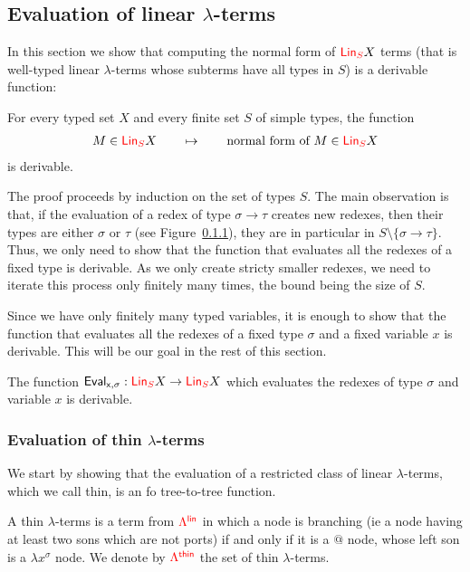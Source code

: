 \subsection{Evaluation of linear $\lambda$-terms}

In this section we show that computing the normal form of ${\color{red}{\mathsf{Lin}_{S}}} X$ terms (that is well-typed linear $\lambda$-terms whose subterms have all types in $S$) is a derivable function:

 \begin{proposition}\label{prop:one-register} 
    For every typed set $X$ and every finite set $S$ of simple types, the function 
    \begin{align*}
        M \in  {\color{red}{\mathsf{Lin}_{S}}} X \qquad \mapsto \qquad \text{normal form of $M$} \in  {\color{red}{\mathsf{Lin}_{S}}} X
    \end{align*}
    is derivable.
\end{proposition}

The proof proceeds by induction on the set of types $S$. The main observation is that, if the evaluation of a redex of type $\sigma\rightarrow \tau$ creates new redexes, then their types are either $\sigma$ or $\tau$ (see Figure~\ref{}), they are in particular in $S\setminus\{\sigma\rightarrow\tau\}$. Thus, we only need to show that the function that evaluates all the redexes of a fixed type is derivable. As we only create stricty smaller redexes, we need to iterate this process only finitely many times, the bound being the size of $S$. 

  Since we have only finitely many typed variables, it is enough to show that the function that evaluates all the redexes of a fixed type $\sigma$ and a fixed variable $x$ is derivable. This will be our goal in the rest of this section.

\begin{theorem}\label{thm:evalOneType}
The function ${\sf{Eval}_{x,\sigma}}:{\color{red}{\mathsf{Lin}_{S}}} X \to{\color{red}{\mathsf{Lin}_{S}}} X$ which evaluates the redexes of type $\sigma$ and variable $x$ is derivable.
\end{theorem}


\subsubsection{Evaluation of thin $\lambda$-terms}

We start by showing that the evaluation of a restricted class of linear $\lambda$-terms, which we call thin, is an fo tree-to-tree function.   

\begin{definition}
A thin $\lambda$-terms is a term from ${\color{red}{\Lambda^{\sf{lin}}}}$ in which a node is branching (ie a node having at least two sons which are not ports) if and only if it is a $\text{@}$ node, whose left son is a $\lambda x^\sigma$ node. We denote by ${\color{red}{\Lambda^{\sf{thin}}}}$ the set of thin $\lambda$-terms.
\end{definition}

